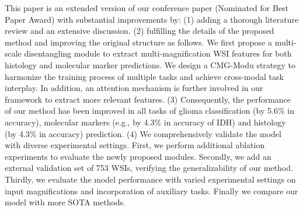 This paper is an extended version of our conference paper \cite{deepMO-Glioma} (Nominated for Best Paper Award) with substantial improvements by:
(1) adding a thorough literature review and an extensive discussion.
(2) fulfilling the details of the proposed method and improving the original structure as follows.
We first propose a multi-scale disentangling module to extract multi-magnification WSI features for both histology and molecular marker predictions.
We design a CMG-Modu strategy to harmonize the training process of multiple tasks and achieve cross-modal task interplay.
In addition, an attention mechanism is further involved in our framework to extract more relevant features. 
(3) Consequently, the performance of our method has been improved in all tasks of glioma classification (by 5.6$\%$ in accuracy), molecular markers (e.g., by 4.3$\%$ in accuracy of IDH) and histology (by 4.3$\%$ in accuracy) prediction.
(4) We comprehensively validate the model with diverse experimental settings. First, we perform additional ablation experiments to evaluate the newly proposed modules. Secondly, we add an external validation set of 753 WSIs, verifying the generalizability of our method.  Thirdly, we  evaluate the model performance with varied experimental settings on input magnifications and incorporation of auxiliary tasks. Finally we compare our model with more SOTA methods.






\vspace{-.5em}